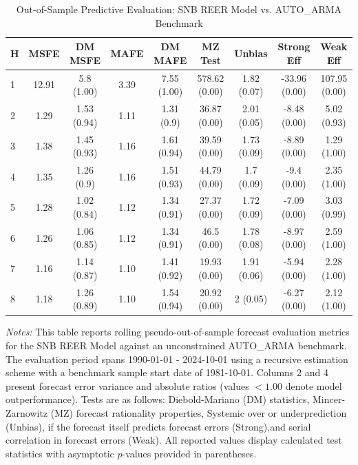 \begin{table}[htbp]
\centering
\caption{Out-of-Sample Predictive Evaluation: SNB REER Model vs. AUTO_ARMA Benchmark}
\label{tab:snb_reer_model_evaluation}
\footnotesize
\begin{tabular}{l cccccccc}
\hline\hline
\rule{0pt}{3ex}
\textbf{H} & \textbf{MSFE} & \textbf{DM MSFE} & \textbf{MAFE} & \textbf{DM MAFE} & \textbf{MZ Test} & \textbf{Unbias} & \textbf{Strong Eff} & \textbf{Weak Eff} \\[0.5ex]
\hline
\rule{0pt}{2.5ex}
1 & 12.91 & 5.8 (1.00) & 3.39 & 7.55 (1.00) & 578.62 (0.00) & 1.82 (0.07) & -33.96 (0.00) & 107.95 (0.00) \\
2 & 1.29 & 1.53 (0.94) & 1.11 & 1.31 (0.9) & 36.87 (0.00) & 2.01 (0.05) & -8.48 (0.00) & 5.02 (0.93) \\
3 & 1.38 & 1.45 (0.93) & 1.16 & 1.61 (0.94) & 39.59 (0.00) & 1.73 (0.09) & -8.89 (0.00) & 1.29 (1.00) \\
4 & 1.35 & 1.26 (0.9) & 1.16 & 1.51 (0.93) & 44.79 (0.00) & 1.7 (0.09) & -9.4 (0.00) & 2.35 (1.00) \\
5 & 1.28 & 1.02 (0.84) & 1.12 & 1.34 (0.91) & 27.37 (0.00) & 1.72 (0.09) & -7.09 (0.00) & 3.03 (0.99) \\
6 & 1.26 & 1.06 (0.85) & 1.12 & 1.34 (0.91) & 46.5 (0.00) & 1.78 (0.08) & -8.97 (0.00) & 2.59 (1.00) \\
7 & 1.16 & 1.14 (0.87) & 1.10 & 1.41 (0.92) & 19.93 (0.00) & 1.91 (0.06) & -5.94 (0.00) & 2.28 (1.00) \\
8 & 1.18 & 1.26 (0.89) & 1.10 & 1.54 (0.94) & 20.92 (0.00) & 2 (0.05) & -6.27 (0.00) & 2.12 (1.00) \\
\hline\hline
\end{tabular}%
\par\smallskip
\parbox{\textwidth}{\scriptsize \textit{Notes:} This table reports rolling pseudo-out-of-sample forecast evaluation metrics for the SNB REER Model against an unconstrained AUTO_ARMA benchmark. The evaluation period spans 1990-01-01 - 2024-10-01 using a recursive estimation scheme with a benchmark sample start date of 1981-10-01. Columns 2 and 4 present forecast error variance and absolute ratios (values $< 1.00$ denote model outperformance). Tests are as follows: Diebold-Mariano (DM) statistics, Mincer-Zarnowitz (MZ) forecast rationality properties, Systemic over or underprediction (Unbias), if the forecast itself predicts forecast errors (Strong),and serial correlation in forecast errors (Weak). All reported values display calculated test statistics with asymptotic $p$-values provided in parentheses.}
\end{table}
